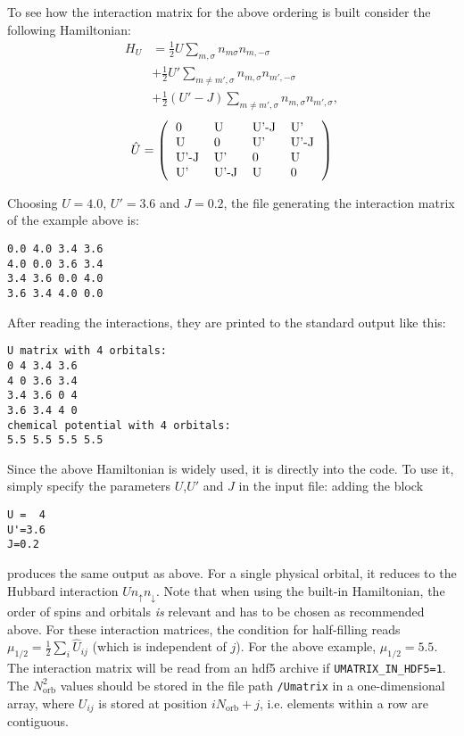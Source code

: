 \documentclass[aps,prb,floatfix,superscriptaddress,twocolumn,notitlepage]{revtex4-1}
\begin{document}
To see how the interaction matrix for the above ordering is built consider the following Hamiltonian:
\begin{align}
H_{U} &=\frac{1}{2}U\sum_{m,\sigma} n_{m\sigma}n_{m,-\sigma} \\ \nonumber &+ \frac{1}{2}U'\sum_{m\neq m',\sigma}n_{m,\sigma}n_{m',-\sigma}
\\ \nonumber&+ \frac{1}{2}(U'-J)\sum_{m\neq m',\sigma} n_{m,\sigma}n_{m',\sigma}, 
\end{align}
\begin{equation}
\hat{U}=\left(\begin{tabular}{llll}
0 & U & U'-J & U'\\
U & 0 & U' & U'-J\\
U'-J & U' & 0 & U\\
U' & U'-J & U & 0\\
\end{tabular}\right)
\end{equation}

Choosing $U=4.0$, $U'=3.6$ and $J=0.2$, the file generating the interaction matrix of the example above is:
\begin{verbatim}
0.0 4.0 3.4 3.6
4.0 0.0 3.6 3.4
3.4 3.6 0.0 4.0
3.6 3.4 4.0 0.0 
\end{verbatim}
After reading the interactions, they are printed to the standard output like this:
\begin{verbatim}
U matrix with 4 orbitals: 
0 4 3.4 3.6 
4 0 3.6 3.4 
3.4 3.6 0 4 
3.6 3.4 4 0
chemical potential with 4 orbitals:
5.5 5.5 5.5 5.5
\end{verbatim}
Since the above Hamiltonian is widely used, it is directly into the code. To use it, simply specify the parameters $U$,$U'$ and $J$ in the input file: adding the block
\begin{verbatim}
U =  4
U'=3.6
J=0.2
\end{verbatim}
produces the same output as above. For a single physical orbital, it reduces to the Hubbard interaction $Un_{\uparrow}n_{\downarrow}$.
Note that when using the built-in Hamiltonian, the order of spins and orbitals \emph{is} relevant and has to be chosen as recommended above.
For these interaction matrices, the condition for half-filling reads $\mu_{1/2}=\frac{1}{2}\sum_{i}\hat{U}_{ij}$ (which is independent of $j$). For the above example, $\mu_{1/2}=5.5$.
The interaction matrix will be read from an hdf5 archive if \verb#UMATRIX_IN_HDF5=1#. The $N_{\text{orb}}^{2}$ values should be stored in the file path \verb#/Umatrix# in a one-dimensional array, where $U_{ij}$ is stored at position $iN_{\text{orb}}+j$, i.e. elements within a row are contiguous.
\end{document}
